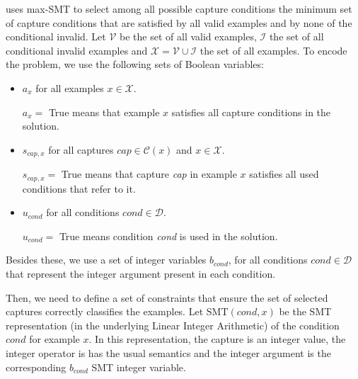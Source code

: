 \Forest uses max-\ac{SMT} to select among all possible capture conditions the minimum set of capture conditions that are satisfied by all valid examples and by none of the conditional invalid.
%
Let \(\mathcal{V}\) be the set of all valid examples, \(\mathcal{I}\) the set of all conditional invalid examples and \(\mathcal{X} = \mathcal{V} \cup \mathcal{I}\) the set of all examples.
To encode the problem, we use the following sets of Boolean variables:
\begin{itemize}
    \item \(a_x\) for all examples \(x \in \mathcal{X}\).
    
    \(a_x = \) True means that example \(x\) satisfies all capture conditions in the solution.
    
    \item \(s_{\textit{cap}, x}\) for all captures \(\textit{cap} \in \mathcal{C}(x)\) and \(x \in \mathcal{X}\).
    
    \(s_{\textit{cap}, x} =\) True means that capture \textit{cap} in example \(x\) satisfies all used conditions that refer to it.

    
    \item \(u_{\textit{cond}}\) for all conditions \(\textit{cond} \in \mathcal{D}\). 
    
    \(u_{\textit{cond}} = \) True means condition \textit{cond} is used in the solution.
\end{itemize}

Besides these, we use a set of integer variables \(b_{\textit{cond}}\), for all conditions \(\textit{cond} \in \mathcal{D}\) that represent the integer argument present in each condition.


Then, we need to define a set of constraints that ensure the set of selected captures correctly classifies the examples.
Let \(\textrm{SMT}(\textit{cond}, x)\) be the \ac{SMT} representation (in the underlying Linear Integer Arithmetic) of the condition \(\textit{cond}\) for example \(x\).
In this representation, the capture is an integer value, the integer operator is has the usual semantics and the integer argument is the corresponding \(b_{\textit{cond}}\) \ac{SMT} integer variable.

